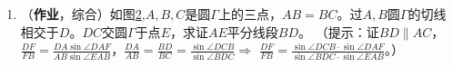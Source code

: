 \documentclass[12pt]{article}
\begin{document}
\begin{enumerate}
\begin{enumerate}[label=(\roman*)]
\begin{figure}[!ht]
\begin{subfigure}[b]{0.45\textwidth}
    \caption{}\label{fig:area}
    \end{subfigure}
    \caption{}
    \end{figure}
\item （\textbf{作业}，综合）如图\ref{fig:area},$A,B,C$是圆$\Gamma$上的三点，$AB=BC$。过$A,B$圆$\Gamma$的切线相交于$D$。$DC$交圆$\Gamma$于点$E$，求证$AE$平分线段$BD$。
（提示：证$BD \parallel AC$，
$\frac{DF}{FB}=\frac{DA\sin\angle DAF}{AB\sin \angle EAB}$，$\frac{DA}{AB}=\frac{BD}{BC}=\frac{\sin \angle DCB}{\sin \angle BDC}\Rightarrow$
$
\frac{DF}{FB}=\frac{\sin \angle DCB\cdot \sin\angle DAF}{\sin \angle BDC\cdot \sin \angle EAB}
$。）
\end{enumerate}
\end{enumerate}
\end{document}
